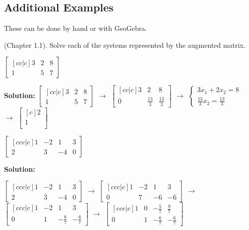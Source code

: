 \subsection*{Additional Examples}

These can be done by hand or with GeoGebra.  

\begin{outline}[enumerate]

	

\1 (Chapter 1.1).  Solve each of the systems represented by the augmented matrix.
 
\2 $  \begin{bmatrix} [cc|c]
3& 2 & 8 \\
 1 & 5 & 7  \end{bmatrix} $  

\bf{Solution:}
$  \begin{bmatrix} [cc|c]
3& 2 & 8 \\
 1 & 5 & 7  \end{bmatrix} $
 $\rightarrow$
$  \begin{bmatrix} [cc|c]
 3 & 2 & 8 \\
 0 & \frac{13}{3} & \frac{13}{3}  \end{bmatrix} $
 $ \rightarrow $
$ \begin{cases} 3x_1 + 2x_2 = 8 \\  \frac{13}{3}x_2 = \frac{13}{3}   \end{cases} $
$\rightarrow$
$ \begin{bmatrix} [c]
 2 \\
 1 \\
 \end{bmatrix} $ 


\item $  \begin{bmatrix} [ccc|c]
1& -2 & 1 & 3 \\
2 & 3 & -4 &  0
  \end{bmatrix} $ 
  
\bf{Solution:}

$  \begin{bmatrix} [ccc|c]
1& -2 & 1 & 3 \\
2 & 3 & -4 &  0
  \end{bmatrix} $
  $\rightarrow$
$  \begin{bmatrix} [ccc|c]
1& -2 & 1 & 3 \\
0 & 7 & -6 &  -6
  \end{bmatrix} $
  $\rightarrow$
$  \begin{bmatrix} [ccc|c]
1& -2 & 1 & 3 \\
0 & 1 & -\frac{6}{7} &  -\frac{6}{7}
  \end{bmatrix} $
  $\rightarrow$
$  \begin{bmatrix} [ccc|c]
1 & 0 & -\frac{5}{7} & \frac{9}{7} \\
0 & 1 & -\frac{6}{7} &  -\frac{6}{7}
  \end{bmatrix} $  
  

\end{outline}
